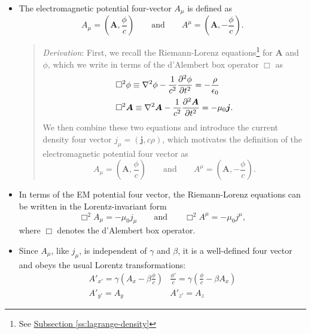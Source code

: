 \documentclass[11pt, a4paper]{article}
\newcommand{\eqtext}[1]{\qquad \text{#1} \qquad}
\renewcommand{\vec}[1]{\bm{#1}} %
\newcommand{\A}{\vec{A}} %
\newcommand{\ee}{\epsilon_{0}}  %
\newcommand{\mm}{\mu_{0}}  %
\renewcommand{\j}{\vec{j}}  %
\renewcommand{\laplacian}{\nabla^{2}}
\begin{document}
\begin{itemize}

    \item The electromagnetic potential four-vector $ A_{\mu} $ is defined as
	\begin{equation*}
		A_{\mu} = \left (\A, \frac{\phi}{c}\right ) \eqtext{and} A^{\mu} = \left (\A, -\frac{\phi}{c}\right ).
	\end{equation*}
    \begin{quote}
        \textit{Derivation}: First, we recall the Riemann-Lorenz equations\footnote{See \hyperref[ss:lagrange-density]{\underline{Subsection \ref{ss:lagrange-density}}}} for $ \A  $ and $ \phi $, which we write in terms of the d'Alembert box operator $ \Box $ as
        \begin{align*}
            & \Box^{2}\phi \equiv \laplacian \phi - \frac{1}{c^{2}}\pdv[2]{\phi}{t} = - \frac{\rho}{\ee}\\
            &\Box^{2} \A \equiv \laplacian \A - \frac{1}{c^{2}} \pdv[2]{\A}{t} = - \mm \j.
        \end{align*}
        We then combine these two equations and introduce the current density four vector $ j_{\mu} = (\j, c\rho) $, which motivates the definition of the electromagnetic potential four vector as
        \begin{equation*}
            A_{\mu} = \left (\A, \frac{\phi}{c}\right ) \eqtext{and} A^{\mu} = \left (\A, -\frac{\phi}{c}\right ).
        \end{equation*}
    \end{quote}

    \item In terms of the EM potential four vector, the Riemann-Lorenz equations can be written in the Lorentz-invariant form
	\begin{equation*}
		\Box ^{2}A_{\mu} = - \mm j_{\mu} \eqtext{and} \Box^{2}A^{\mu} = - \mm j^{\mu},
	\end{equation*}
    where $ \Box $ denotes the d'Alembert box operator.
	
	\item Since $ A_{\mu} $, like $ j_{\mu} $, is independent of $ \gamma $ and $ \beta $, it is a well-defined four vector and obeys the usual Lorentz transformations:
	\begin{equation*}
        \begin{array}{ll}
            A'_{x'} = \gamma \left(A_{x} - \beta \frac{\phi}{c} \right) & \frac{\phi'}{c} = \gamma \left(\frac{\phi}{c} - \beta A_{x}\right) \\
            A'_{y'} = A_{y} & A'_{z'} = A_{z}
        \end{array}
	\end{equation*}
	

\end{itemize}
\end{document}
